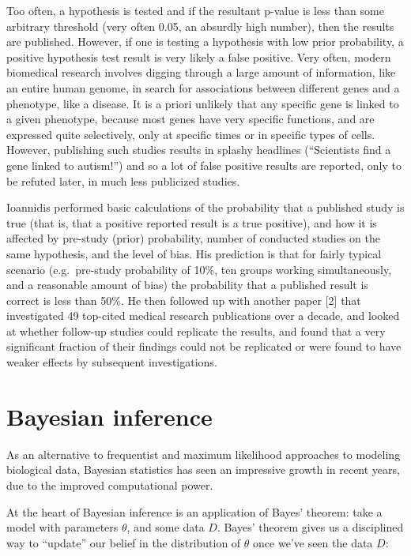 \documentclass[
  letterpaper,
  DIV=11,
  numbers=noendperiod]{scrreprt}
\begin{document}
Too often, a hypothesis is tested and if the resultant p-value is less
than some arbitrary threshold (very often 0.05, an absurdly high
number), then the results are published. However, if one is testing a
hypothesis with low prior probability, a positive hypothesis test result
is very likely a false positive. Very often, modern biomedical research
involves digging through a large amount of information, like an entire
human genome, in search for associations between different genes and a
phenotype, like a disease. It is a priori unlikely that any specific
gene is linked to a given phenotype, because most genes have very
specific functions, and are expressed quite selectively, only at
specific times or in specific types of cells. However, publishing such
studies results in splashy headlines (``Scientists find a gene linked to
autism!'') and so a lot of false positive results are reported, only to
be refuted later, in much less publicized studies.

Ioannidis performed basic calculations of the probability that a
published study is true (that is, that a positive reported result is a
true positive), and how it is affected by pre-study (prior) probability,
number of conducted studies on the same hypothesis, and the level of
bias. His prediction is that for fairly typical scenario (e.g.~pre-study
probability of 10\%, ten groups working simultaneously, and a reasonable
amount of bias) the probability that a published result is correct is
less than 50\%. He then followed up with another paper {[}2{]} that
investigated 49 top-cited medical research publications over a decade,
and looked at whether follow-up studies could replicate the results, and
found that a very significant fraction of their findings could not be
replicated or were found to have weaker effects by subsequent
investigations.

\section{Bayesian inference}\label{bayesian-inference}

As an alternative to frequentist and maximum likelihood approaches to
modeling biological data, Bayesian statistics has seen an impressive
growth in recent years, due to the improved computational power.

At the heart of Bayesian inference is an application of Bayes' theorem:
take a model with parameters \(\theta\), and some data \(D\). Bayes'
theorem gives us a disciplined way to ``update'' our belief in the
distribution of \(\theta\) once we've seen the data \(D\):
\end{document}
